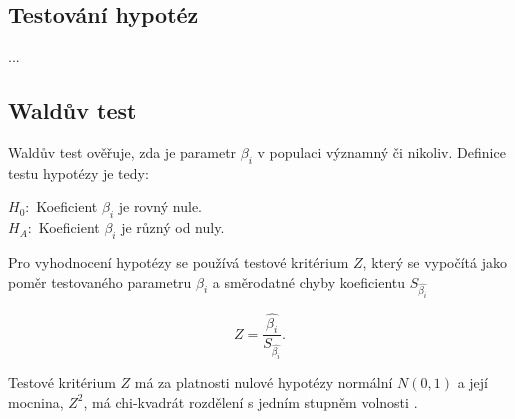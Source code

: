 \subsection{Testování hypotéz}
...

\subsection{Waldův test}
Waldův test ověřuje, zda je parametr $\beta_i$ v populaci významný či nikoliv. Definice testu hypotézy je tedy:

$H_0:$ Koeficient $\beta_i$ je rovný nule. \\
$H_A:$ Koeficient $\beta_i$ je různý od nuly.

Pro vyhodnocení hypotézy se používá
{\color{red}
testové kritérium
}
$Z$, který se vypočítá jako poměr testovaného parametru $\beta_i$
a směrodatné chyby koeficientu $S_{\hat{\beta_i}}$

\begin{equation}
    Z = \frac{\hat{\beta_i}}{S_{\hat{\beta_i}}}.
\end{equation}

{\color{red}
Testové kritérium
}
$Z$ má za platnosti nulové hypotézy normální $N(0, 1)$ a její mocnina, $Z^2$, má chi-kvadrát rozdělení s jedním stupněm volnosti \cite{Kleinbaum2010}.
